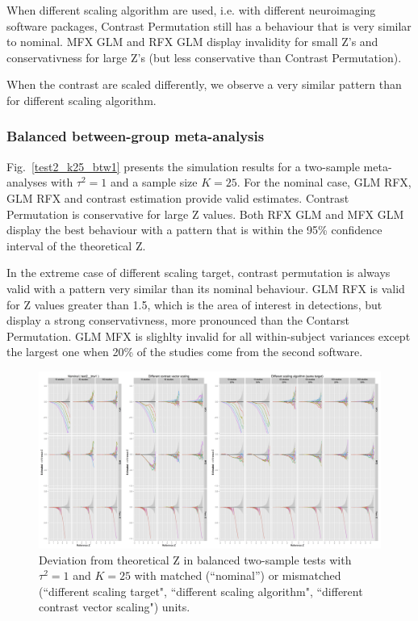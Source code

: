 \documentclass[preprint,12pt]{elsarticle}
\newcommand{\nStudies}{K}
\newcommand{\varBetween}{\tau^2}
\begin{document}
When different scaling algorithm are used, i.e. with different neuroimaging software packages, Contrast Permutation still has a behaviour that is very similar to nominal. MFX GLM and RFX GLM display invalidity for small Z's and conservativness for large Z's (but less conservative than Contrast Permutation). 

When the contrast are scaled differently, we observe a very similar pattern than for different scaling algorithm.

\subsubsection{Balanced between-group meta-analysis}

Fig.~\ref{test2_k25_btw1} presents the simulation results for a two-sample meta-analyses with $\varBetween=1$ and a sample size $\nStudies = 25$. For the nominal case, GLM RFX, GLM RFX and contrast estimation provide valid estimates. Contrast Permutation is conservative for large Z values. Both RFX GLM and MFX GLM display the best behaviour with a pattern that is within the 95\% confidence interval of the theoretical Z.

In the extreme case of different scaling target, contrast permutation is always valid with a pattern very similar than its nominal behaviour. GLM RFX is valid for Z values greater than 1.5, which is the area of interest in detections, but display a strong conservativness, more pronounced than the Contarst Permutation. GLM MFX is slighlty invalid for all within-subject variances except the largest one when 20\% of the studies come from the second software.

\begin{figure}[t]
	\centering
 	\includegraphics[width=0.99\linewidth]{./figures/test2_btw1.png}
	\caption{Deviation from theoretical Z in balanced two-sample tests with $\varBetween=1$ and $\nStudies = 25$ with matched (``nominal'') or mismatched (``different scaling target", ``different scaling algorithm", ``different contrast vector scaling") units.}
	\label{test2_btw1}
\end{figure}
\end{document}
